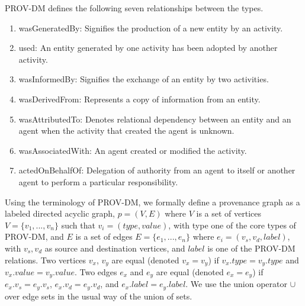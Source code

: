 \par PROV-DM defines the following seven relationships between the types. 

\begin{enumerate}


\item wasGeneratedBy: Signifies the production of a new entity by an activity. 

\item used: An entity generated by one activity has been adopted by another activity.

\item wasInformedBy: Signifies the exchange of an entity by two activities.

\item wasDerivedFrom: Represents a copy of information from an entity. 

\item wasAttributedTo: Denotes relational dependency between an entity and an agent when the activity that created the agent is unknown.

\item wasAssociatedWith: An agent created or modified the activity.

\item actedOnBehalfOf: Delegation of authority from an agent to itself or another agent to perform a particular responsibility. 



\end{enumerate}


Using the terminology of PROV-DM, we formally define a provenance graph as a labeled directed acyclic graph, $p = (V,E)$ where $V$ is a set of vertices $V =\{v_1,...,v_n\}$ such that $v_i = (type, value)$, with type one of the core types of PROV-DM, and $E$ is a set of edges $E =\{e_1,..., e_n\}$ where $e_i = (v_s, v_d, label)$, with $v_s, v_d$ as source and destination vertices, and $label$ is one of the PROV-DM relations. Two vertices $v_x$, $v_y$ are equal (denoted $ v_x = v_y$) if $v_x.type = v_y.type$ and $v_x.value = v_y.value$. Two edges $e_x $ and $e_y$ are equal (denoted $e_x = e_y$) if $e_x.v_s = e_y.v_s$, $e_x.v_d = e_y.v_d$, and $e_x.label = e_y.label$.  We use the union operator $\cup$ over edge sets in the usual way of the union of sets.



